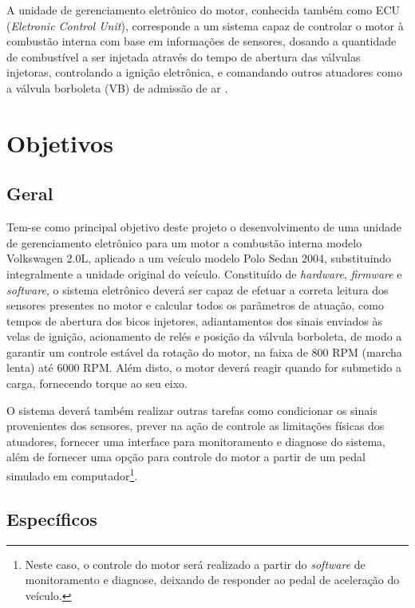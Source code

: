 	A unidade de gerenciamento eletrônico do motor, conhecida também como ECU (\textit{Eletronic Control Unit}), corresponde a um sistema capaz de controlar o motor à combustão interna com base em informações de sensores, dosando a quantidade de combustível a ser injetada através do tempo de abertura das válvulas injetoras, controlando a ignição eletrônica, e comandando outros atuadores como a válvula borboleta (VB) de admissão de ar \cite{ecucontinental}.
	
\section{Objetivos}

	\subsection{Geral}
	
	Tem-se como principal objetivo deste projeto o desenvolvimento de uma unidade de gerenciamento eletrônico para um motor a combustão interna modelo Volkswagen 2.0L, aplicado a um veículo modelo Polo Sedan 2004, substituindo integralmente a unidade original do veículo. Constituído de \textit{hardware}, \textit{firmware} e \textit{software}, o sistema eletrônico deverá ser capaz de efetuar a correta leitura dos sensores presentes no motor e calcular todos os parâmetros de atuação, como tempos de abertura dos bicos injetores, adiantamentos dos sinais enviados às velas de ignição, acionamento de relés e posição da válvula borboleta, de modo a garantir um controle estável da rotação do motor, na faixa de 800 RPM (marcha lenta) até 6000 RPM. Além disto, o motor deverá reagir quando for submetido a carga, fornecendo torque ao seu eixo.
	
	O sistema deverá também realizar outras tarefas como condicionar os sinais provenientes dos sensores, prever na ação de controle as limitações físicas dos atuadores, fornecer uma interface para monitoramento e diagnose do sistema, além de fornecer uma opção para controle do motor a partir de um pedal simulado em computador\footnote{Neste caso, o controle do motor será realizado a partir do \textit{software} de monitoramento e diagnose, deixando de responder ao pedal de aceleração do veículo.}.

	\subsection{Específicos}
	
